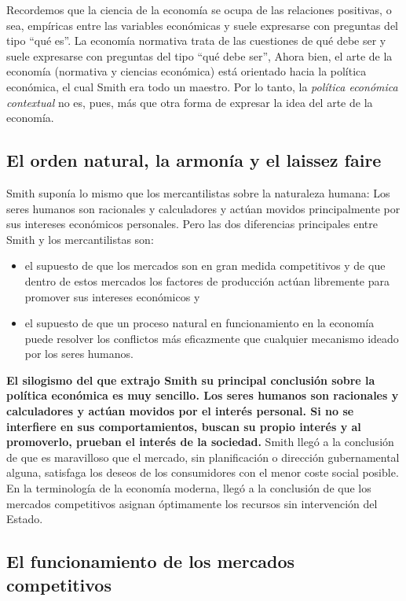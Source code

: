 \documentclass[10pt]{book}
\begin{document}
Recordemos que la ciencia de la economía se ocupa de las relaciones positivas, o sea, empíricas entre las variables económicas y suele expresarse con preguntas del tipo “qué es”. La economía normativa trata de las cuestiones de qué debe ser y suele expresarse con preguntas del tipo “qué debe ser”, Ahora bien, el arte de la economía (normativa y ciencias económica) está orientado hacia la política económica, el cual Smith era todo un maestro. Por lo tanto, la \textit{política económica contextual} no es, pues, más que otra forma de expresar la idea del arte de la economía.\\

\subsection{El orden natural, la armonía y el laissez faire}

Smith suponía lo mismo que los mercantilistas sobre la naturaleza humana: Los seres humanos son racionales y calculadores y actúan movidos principalmente por sus intereses económicos personales. Pero las dos diferencias principales entre Smith y los mercantilistas son:
\begin{itemize}
    \item el supuesto de que los mercados son en gran medida competitivos y de que dentro de estos mercados los factores de producción actúan libremente para promover sus intereses económicos y
    \item el supuesto de que un proceso natural en funcionamiento en la economía puede resolver los conflictos más eficazmente que cualquier mecanismo ideado por los seres humanos.
\end{itemize}

\textbf{El silogismo del que extrajo Smith su principal conclusión sobre la política económica es muy sencillo. Los seres humanos son racionales y calculadores y actúan movidos por el interés personal. Si no se interfiere en sus comportamientos, buscan su propio interés y al promoverlo, prueban el interés de la sociedad.} Smith llegó a la conclusión de que es maravilloso que el mercado, sin planificación o dirección gubernamental alguna, satisfaga los deseos de los consumidores con el menor coste social posible. En la terminología de la economía moderna, llegó a la conclusión de que los mercados competitivos asignan óptimamente los recursos sin intervención del Estado.

\subsection{El funcionamiento de los mercados competitivos}
\end{document}
